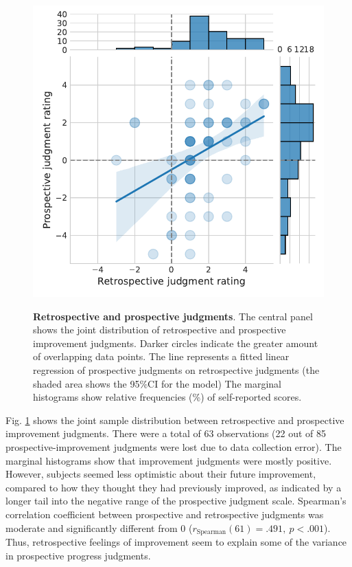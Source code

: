 \begin{figure}[bth]
    \centering
    {\includegraphics[width=.6\linewidth]{Figures/c5/jolds_corr.pdf}}
    \caption[]{\textbf{Retrospective and prospective judgments}. The central panel shows the joint distribution of retrospective and prospective improvement judgments. Darker circles indicate the greater amount of overlapping data points. The line represents a fitted linear regression of prospective judgments on retrospective judgments (the shaded area shows the 95\%\ac{CI} for the model) The marginal histograms show relative frequencies (\%) of self-reported scores.}\label{fig:5-jolds_corr}
\end{figure}

Fig. \ref{fig:5-jolds_corr} shows the joint sample distribution between retrospective and prospective improvement judgments. There were a total of 63 observations (22 out of 85 prospective-improvement judgments were lost due to data collection error). The marginal histograms show that improvement judgments were mostly positive. However, subjects seemed less optimistic about their future improvement, compared to how they thought they had previously improved, as indicated by a longer tail into the negative range of the prospective judgment scale. Spearman's correlation coefficient between prospective and retrospective judgments was moderate and significantly different from 0 ($r_{\mathrm{Spearman}}(61) = .491,\ p < .001$). Thus, retrospective feelings of improvement seem to explain some of the variance in prospective progress judgments.

